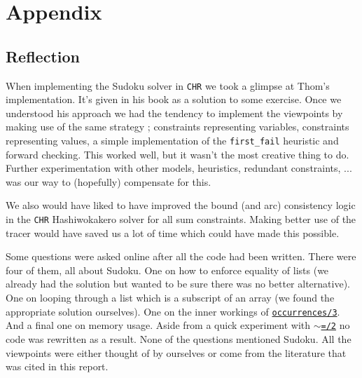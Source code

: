 \section*{Appendix}
\label{sec:appendix}

\subsection*{Reflection}\label{sec:reflection}

When implementing the Sudoku solver in \texttt{CHR} we took a glimpse at Thom's implementation. It's given in his book as a solution to some exercise. Once we understood his approach we had the tendency to implement the viewpoints by making use of the same strategy ; constraints representing variables, constraints representing values, a simple implementation of the \texttt{first\_fail} heuristic and forward checking. This worked well, but it wasn't the most creative thing to do. Further experimentation with other models, heuristics, redundant constraints, ... was our way to (hopefully) compensate for this.\\\par

We also would have liked to have improved the bound (and arc) consistency logic in the \texttt{CHR} Hashiwokakero solver for all sum constraints. Making better use of the tracer would have saved us a lot of time which could have made this possible.\\\par

Some questions were asked online after all the code had been written. There were four of them, all about Sudoku. One on how to enforce equality of lists (we already had the solution but wanted to be sure there was no better alternative). One on looping through a list which is a subscript of an array (we found the appropriate solution ourselves). One on the inner workings of \href{http://eclipseclp.org/doc/bips/lib/ic_global/occurrences-3.html}{\texttt{occurrences/3}}. And a final one on memory usage. Aside from a quick experiment with \href{https://eclipseclp.org/doc/bips/kernel/termcomp/TE-2.html}{\texttt{$\sim$=/2}} no code was rewritten as a result. None of the questions mentioned Sudoku. All the viewpoints were either thought of by ourselves or come from the literature that was cited in this report.


